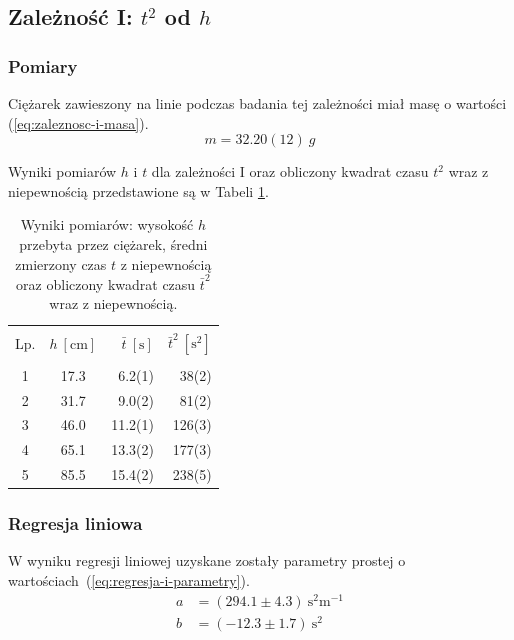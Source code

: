 \documentclass[twocolumn, a4paper, polish, 10pt]{article}
\begin{document}
\subsection{Zależność I: \texorpdfstring{$t^2$}{t²} od \texorpdfstring{$h$}{h}}
\subsubsection{Pomiary}
Ciężarek zawieszony na linie podczas badania tej zależności miał masę o wartości (\ref{eq:zaleznosc-i-masa}).
\begin{equation}
    m = 32.20(12)~g
    \label{eq:zaleznosc-i-masa}
\end{equation}

Wyniki pomiarów $h$ i $t$ dla zależności I oraz obliczony kwadrat czasu $t^2$ wraz z niepewnością przedstawione są w Tabeli \ref{tab:zaleznosc-i}.
\begin{table}[ht]
\begin{center}
\renewcommand*{\tablename}{Tabela}
\caption{\small Wyniki pomiarów: wysokość $h$ przebyta przez ciężarek, średni zmierzony czas $t$ z niepewnością oraz obliczony kwadrat czasu $\bar{t}^2$ wraz z niepewnością.\vspace{0.15cm}
    \label{tab:zaleznosc-i}}
    {\small
    \begin{tabular}{c c r r}
    \hline \vspace{-0.35cm} \\
      Lp.
      & $h~[\mathrm{cm}]$ & $\bar{t}~[\mathrm{s}]$ & $\bar{t}^2~[\mathrm{s^2}]$ \\ 
      \hline \vspace{-0.2cm} \\
     1 & 17.3 & 6.2(1) & 38(2) \\
     2 & 31.7 & 9.0(2) & 81(2) \\
     3 & 46.0 & 11.2(1) & 126(3) \\
     4 & 65.1 & 13.3(2) & 177(3) \\
     5 & 85.5 & 15.4(2) & 238(5) \\
    \hline
    \end{tabular}}
    \end{center}
\end{table}

\subsubsection{Regresja liniowa}
W wyniku regresji liniowej uzyskane zostały parametry prostej o wartościach~(\ref{eq:regresja-i-parametry}).
\begin{equation}
\begin{split}
    a &= (294.1 \pm 4.3)~\mathrm{ s^2 m^{-1} } \\
    b &= (-12.3 \pm 1.7)~\mathrm{s^2}
    \label{eq:regresja-i-parametry}
\end{split}
\end{equation}
\end{document}
